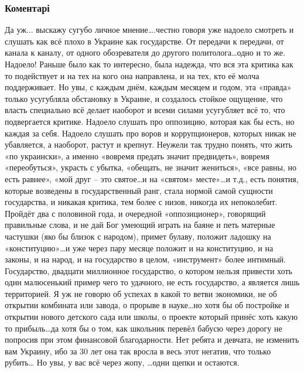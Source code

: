 
 
 
 
 
\subsubsection{Коментарі}

\begin{itemize} %

Да уж... выскажу сугубо личное мнение….честно говоря уже надоело смотреть и
слушать как всё плохо в Украине как государстве. От передачи к передачи, от
канала к каналу, от одного обозревателя до другого политолога…одно и то же.
Надоело! Раньше было как то интересно, была надежда, что вся эта критика как то
подействует и на тех на кого она направлена, и на тех, кто её молча
поддерживает. Но увы, с каждым днём, каждым месяцем и годом, эта «правда»
только усугубляла обстановку в Украине, и создалось стойкое ощущение, что
власть специально всё делает наоборот и всеми силами усугубляет всё то, что
подвергается критике. Надоело слушать про оппозицию, которая как бы есть, но
каждая за себя. Надоело слушать про воров и коррупционеров, которых никак не
убавляется, а наоборот, растут и крепнут. Неужели так трудно понять, что жить
«по украински», а именно «вовремя предать значит предвидеть», вовремя
«переобуться», украсть с убытка, «обещать, не значит жениться», «все равны, но
есть равнее», «мой друг – это святое…и на «святом» месте»…и т.д., есть понятия,
которые возведены в государственный ранг, стала нормой самой сущности
государства, и никакая критика, тем более с низов, никогда их непоколебит.
Пройдёт два с половиной года, и очередной «оппозиционер», говорящий правильные
слова, и не дай Бог умеющий играть на баяне и петь матерные частушки (яко бы
близок с народом), примет булаву, положит ладошку на «конституцию»…и уже через
пару месяце положит и на конституцию, и на законы, и на народ, и на государство
в целом, «инструмент» более интимный. Государство, двадцати миллионное
государство, о котором нельзя привести хоть один малюсенький пример чего то
удачного, не есть государство, а является лишь территорией. Я уж не говорю об
успехах в какой то ветви экономики, не об открытии комбината или завода, о
прорыве в науке…но хотя бы об постройке и открытии нового детского сада или
школы, о проекте который принёс хоть какую то прибыль…да хотя бы о том, как
школьник перевёл бабусю через дорогу не попросив при этом финансовой
благодарности. Нет ребята и девчата, не изменить вам Украину, ибо за 30 лет она
так вросла в весь этот негатив, что только рубить… Но увы, у вас всё через
жопу, …одни щепки и остаются.


\end{itemize}
